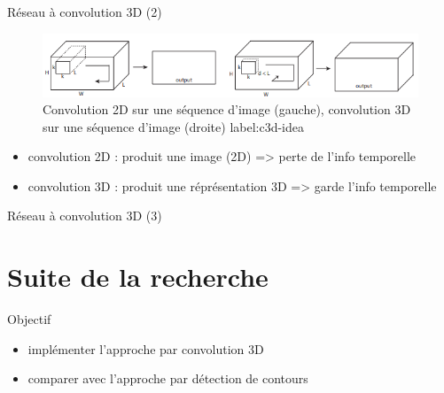 \documentclass[presentation]{beamer}
\begin{document}
\begin{frame}[label={sec:orgb9bae18}]{Réseau à convolution 3D (2)}
\begin{figure}[htbp]
\centering
\includegraphics[width=.9\linewidth]{c3d_idea.png}
\caption{Convolution 2D sur une séquence d'image (gauche), convolution 3D sur une séquence d'image (droite) label:c3d-idea}
\end{figure}
\begin{itemize}
\item convolution 2D : produit une image (2D) => perte de l'info temporelle
\item convolution 3D : produit une réprésentation 3D => garde l'info temporelle
\end{itemize}
\end{frame}

\begin{frame}[label={sec:org2057f15}]{Réseau à convolution 3D (3)}
\end{frame}


\section{Suite de la recherche}
\label{sec:org3e2c8ef}
\begin{frame}[label={sec:org5c4537c}]{Objectif}
\begin{itemize}
\item implémenter l'approche par convolution 3D
\item comparer avec l'approche par détection de contours
\end{itemize}
\end{frame}
\end{document}

